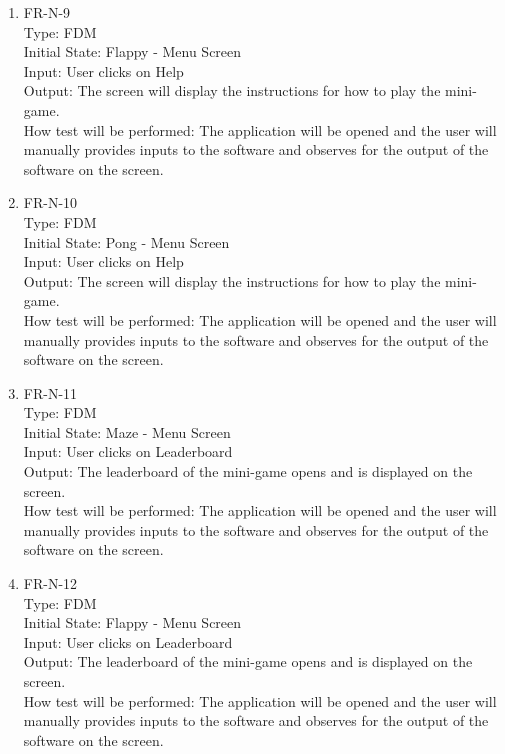 \documentclass[12pt, titlepage]{article}
\begin{document}
\begin{enumerate}
\item{FR-N-9\\}
Type: FDM\\
Initial State: Flappy - Menu Screen\\
Input: User clicks on Help\\
Output: The screen will display the instructions for how to play the mini-game.\\
How test will be performed: The application will be opened and the user will manually provides inputs to the software and observes for the output of the software on the screen.\\

\item{FR-N-10\\}
Type: FDM\\
Initial State: Pong - Menu Screen\\
Input: User clicks on Help\\
Output: The screen will display the instructions for how to play the mini-game.\\
How test will be performed: The application will be opened and the user will manually provides inputs to the software and observes for the output of the software on the screen.\\

\item{FR-N-11\\}
Type: FDM\\
Initial State: Maze - Menu Screen\\
Input: User clicks on Leaderboard\\
Output: The leaderboard of the mini-game opens and is displayed on the screen.\\
How test will be performed: The application will be opened and the user will manually provides inputs to the software and observes for the output of the software on the screen.\\

\item{FR-N-12\\}
Type: FDM\\
Initial State: Flappy - Menu Screen\\
Input: User clicks on Leaderboard\\
Output: The leaderboard of the mini-game opens and is displayed on the screen.\\
How test will be performed: The application will be opened and the user will manually provides inputs to the software and observes for the output of the software on the screen.\\


\end{enumerate}
\end{document}
